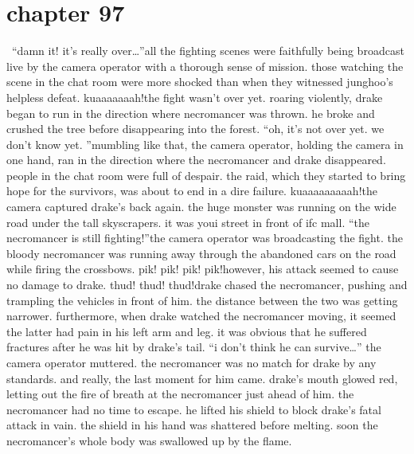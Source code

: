 \section{chapter 97}






 “damn it! it’s really over…”all the fighting scenes were faithfully being broadcast live by the camera operator with a thorough sense of mission.
 those watching the scene in the chat room were more shocked than when they witnessed junghoo’s helpless defeat.
kuaaaaaaah!the fight wasn’t over yet.
roaring violently, drake began to run in the direction where necromancer was thrown.
he broke and crushed the tree before disappearing into the forest.
“oh, it’s not over yet.
 we don’t know yet.
”mumbling like that, the camera operator, holding the camera in one hand, ran in the direction where the necromancer and drake disappeared.
people in the chat room were full of despair.
 the raid, which they started to bring hope for the survivors, was about to end in a dire failure.
kuaaaaaaaaah!the camera captured drake’s back again.
 the huge monster was running on the wide road under the tall skyscrapers.
 it was youi street in front of ifc mall.
“the necromancer is still fighting!”the camera operator was broadcasting the fight.
 the bloody necromancer was running away through the abandoned cars on the road while firing the crossbows.
pik! pik! pik! pik!however, his attack seemed to cause no damage to drake.
thud! thud! thud!drake chased the necromancer, pushing and trampling the vehicles in front of him.
the distance between the two was getting narrower.
furthermore, when drake watched the necromancer moving, it seemed the latter had pain in his left arm and leg.
 it was obvious that he suffered fractures after he was hit by drake’s tail.
“i don’t think he can survive…” the camera operator muttered.
the necromancer was no match for drake by any standards.
and really, the last moment for him came.
drake’s mouth glowed red, letting out the fire of breath at the necromancer just ahead of him.
 the necromancer had no time to escape.
 he lifted his shield to block drake’s fatal attack in vain.
the shield in his hand was shattered before melting.
 soon the necromancer’s whole body was swallowed up by the flame.

